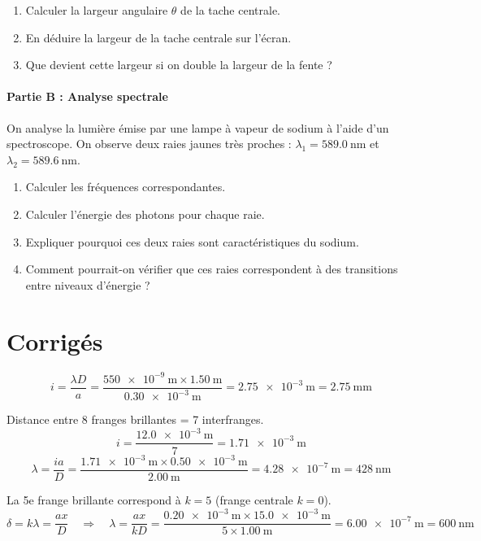\begin{enumerate}
  \item Calculer la largeur angulaire \(\theta\) de la tache centrale.
  \item En déduire la largeur de la tache centrale sur l'écran.
  \item Que devient cette largeur si on double la largeur de la fente ?
\end{enumerate}

\paragraph{Partie B : Analyse spectrale}
On analyse la lumière émise par une lampe à vapeur de sodium à l'aide d'un spectroscope. On observe deux raies jaunes très proches : \(\lambda_1 = \SI{589.0}{\nano\metre}\) et \(\lambda_2 = \SI{589.6}{\nano\metre}\).

\begin{enumerate}
  \item Calculer les fréquences correspondantes.
  \item Calculer l'énergie des photons pour chaque raie.
  \item Expliquer pourquoi ces deux raies sont caractéristiques du sodium.
  \item Comment pourrait-on vérifier que ces raies correspondent à des transitions entre niveaux d'énergie ?
\end{enumerate}

\section{Corrigés}

\[
i = \frac{\lambda D}{a} = \frac{\SI{550e-9}{\metre} \times \SI{1.50}{\metre}}{\SI{0.30e-3}{\metre}} = \SI{2.75e-3}{\metre} = \SI{2.75}{\milli\metre}
\]

Distance entre 8 franges brillantes = 7 interfranges.
\[
i = \frac{\SI{12.0e-3}{\metre}}{7} = \SI{1.71e-3}{\metre}
\]
\[
\lambda = \frac{i a}{D} = \frac{\SI{1.71e-3}{\metre} \times \SI{0.50e-3}{\metre}}{\SI{2.00}{\metre}} = \SI{4.28e-7}{\metre} = \SI{428}{\nano\metre}
\]

La 5e frange brillante correspond à \(k=5\) (frange centrale \(k=0\)).
\[
\delta = k \lambda = \frac{a x}{D} \quad \Rightarrow \quad \lambda = \frac{a x}{k D} = \frac{\SI{0.20e-3}{\metre} \times \SI{15.0e-3}{\metre}}{5 \times \SI{1.00}{\metre}} = \SI{6.00e-7}{\metre} = \SI{600}{\nano\metre}
\]

